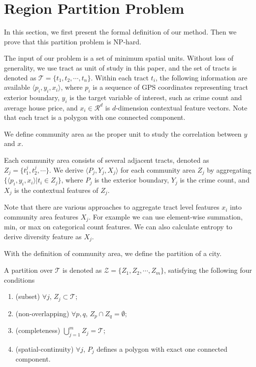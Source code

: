 \section{Region Partition Problem}
\label{sec:problem}

In this section, we first present the formal definition of our method. Then we prove that this partition problem is NP-hard.


The input of our problem is a set of minimum spatial units. Without loss of generality, we use tract as unit of study in this paper, and the set of tracts is denoted as $\mathcal{T} = \{ t_1, t_2, \cdots, t_n \}$. Within each tract $t_i$, the following information are available $\langle p_i, y_i, x_i \rangle$, where $p_i$ is a sequence of GPS coordinates representing tract exterior boundary, $y_i$ is the target variable of interest, such as crime count and average house price, and $x_i \in \mathcal{R}^d$ is $d$-dimension contextual feature vectors. Note that each tract is a polygon with one connected component.

We define community area as the proper unit to study the correlation between $y$ and $x$.
\begin{definition}
 Each community area consists of several adjacent tracts, denoted as $Z_j = \{t_1^j, t_2^j, \cdots \}$. We derive $\langle P_j, Y_j, X_j \rangle$ for each community area $Z_j$ by aggregating $\{ \langle p_i, y_i, x_i \rangle | t_i \in Z_j \}$, where $P_j$ is the exterior boundary, $Y_j$ is the crime count, and $X_j$ is the contextual features of $Z_j$.
\end{definition}
Note that there are various approaches to aggregate tract level features $x_i$ into community area features $X_j$. For example we can use element-wise summation, min, or max on categorical count features. We can also calculate entropy to derive diversity feature as $X_j$.

With the definition of community area, we define the partition of a city.
\begin{definition}[Partition]
\label{def:partition}
A partition over $\mathcal{T}$ is denoted as $\mathcal{Z} = \{ Z_1, Z_2, \cdots, Z_m\}$, satisfying the following four conditions
\begin{enumerate}
\item (subset) $\forall j$, $Z_j \subset \mathcal{T}$;
\item (non-overlapping) $\forall p, q$, $Z_p \cap Z_q = \emptyset$;
\item (completeness) $\bigcup_{j=1}^m Z_j = \mathcal{T}$;
\item (spatial-continuity) $\forall j$, $P_j$ defines a polygon with exact one connected component.
\end{enumerate}
\end{definition}

